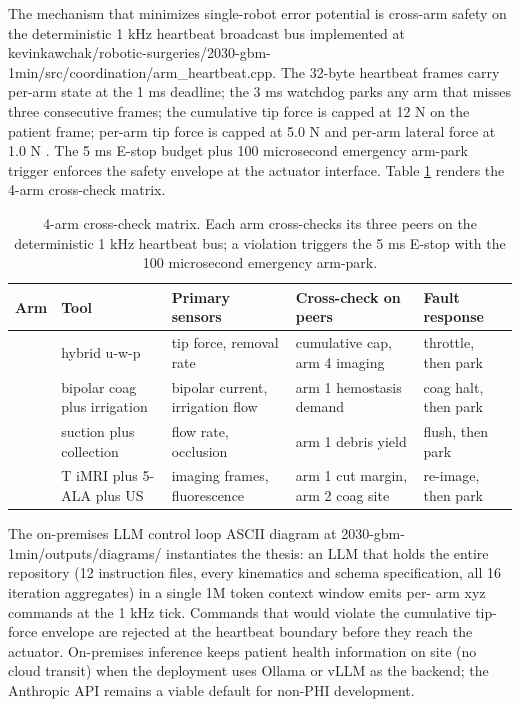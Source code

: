 The mechanism that minimizes single-robot error potential is
cross-arm safety on the deterministic 1 kHz heartbeat broadcast bus
implemented at
kevinkawchak/robotic-surgeries/2030-gbm-1min/src/coordination/arm_heartbeat.cpp.
The 32-byte heartbeat frames carry per-arm state at the 1 ms
deadline; the 3 ms watchdog parks any arm that misses three
consecutive frames; the cumulative tip force is capped at 12 N on
the patient frame; per-arm tip force is capped at 5.0 N and per-arm
lateral force at 1.0 N \cite{iec-80601-2-77, iec-62304}. The 5 ms
E-stop budget plus 100 microsecond emergency arm-park trigger
enforces the safety envelope at the actuator interface.
Table \ref{tab:cross-check} renders the 4-arm cross-check matrix.

\begin{table}[H]
\centering
\caption{4-arm cross-check matrix. Each arm cross-checks its three
peers on the deterministic 1 kHz heartbeat bus; a violation triggers
the 5 ms E-stop with the 100 microsecond emergency arm-park.}
\label{tab:cross-check}
\begin{tabular}{>{\raggedright\arraybackslash}p{1.0cm}
                >{\raggedright\arraybackslash}p{2.6cm}
                >{\raggedright\arraybackslash}p{3.2cm}
                >{\raggedright\arraybackslash}p{3.4cm}
                >{\raggedright\arraybackslash}p{3.0cm}}
\toprule
\textbf{Arm} & \textbf{Tool} & \textbf{Primary sensors} & \textbf{Cross-check on peers} & \textbf{Fault response} \\
\midrule
1 & hybrid u-w-p & tip force, removal rate & cumulative cap, arm 4 imaging & throttle, then park \\
2 & bipolar coag plus irrigation & bipolar current, irrigation flow & arm 1 hemostasis demand & coag halt, then park \\
3 & suction plus collection & flow rate, occlusion & arm 1 debris yield & flush, then park \\
4 & 0.5 T iMRI plus 5-ALA plus US & imaging frames, fluorescence & arm 1 cut margin, arm 2 coag site & re-image, then park \\
\bottomrule
\end{tabular}
\end{table}

The on-premises LLM control loop ASCII diagram at
2030-gbm-1min/outputs/diagrams/ instantiates the thesis: an LLM that
holds the entire repository (12 instruction files, every kinematics
and schema specification, all 16 iteration aggregates) in a single
1M token context window \cite{claude-opus-47, claude-code} emits per-
arm xyz commands at the 1 kHz tick. Commands that would violate the
cumulative tip-force envelope are rejected at the heartbeat boundary
before they reach the actuator. On-premises inference keeps patient
health information on site (no cloud transit) when the deployment
uses Ollama \cite{ollama} or vLLM \cite{vllm} as the backend; the
Anthropic API remains a viable default for non-PHI development.


